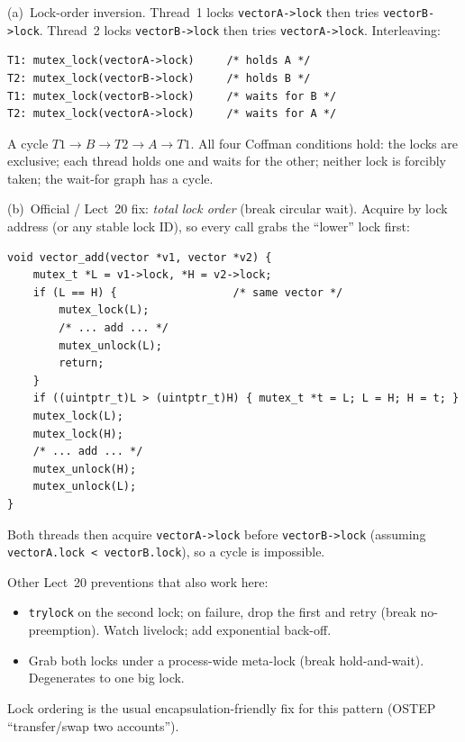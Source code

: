 \documentclass[11pt,a4paper]{article}
\newenvironment{Sol}{%
  \begin{tcolorbox}[sboxstyle, title={Solution}]%
}{%
  \end{tcolorbox}\vspace{0.35em}%
}
\begin{document}
\begin{Sol}
(a)~Lock-order inversion. Thread~1 locks \texttt{vectorA->lock} then tries
\texttt{vectorB->lock}. Thread~2 locks \texttt{vectorB->lock} then tries
\texttt{vectorA->lock}. Interleaving:
\begin{lstlisting}[numbers=none]
T1: mutex_lock(vectorA->lock)     /* holds A */
T2: mutex_lock(vectorB->lock)     /* holds B */
T1: mutex_lock(vectorB->lock)     /* waits for B */
T2: mutex_lock(vectorA->lock)     /* waits for A */
\end{lstlisting}
A cycle $T1 \to B \to T2 \to A \to T1$. All four Coffman conditions hold:
the locks are exclusive; each thread holds one and waits for the other;
neither lock is forcibly taken; the wait-for graph has a cycle.

(b)~Official / Lect~20 fix: \emph{total lock order} (break circular wait).
Acquire by lock address (or any stable lock ID), so every call grabs the
``lower'' lock first:
\begin{lstlisting}[numbers=none]
void vector_add(vector *v1, vector *v2) {
    mutex_t *L = v1->lock, *H = v2->lock;
    if (L == H) {                  /* same vector */
        mutex_lock(L);
        /* ... add ... */
        mutex_unlock(L);
        return;
    }
    if ((uintptr_t)L > (uintptr_t)H) { mutex_t *t = L; L = H; H = t; }
    mutex_lock(L);
    mutex_lock(H);
    /* ... add ... */
    mutex_unlock(H);
    mutex_unlock(L);
}
\end{lstlisting}
Both threads then acquire \texttt{vectorA->lock} before \texttt{vectorB->lock} (assuming
\texttt{vectorA.lock < vectorB.lock}), so a cycle is impossible.

Other Lect~20 preventions that also work here:
\begin{itemize}
  \item \texttt{trylock} on the second lock; on failure, drop the first and
        retry (break no-preemption). Watch livelock; add exponential
        back-off.
  \item Grab both locks under a process-wide meta-lock (break
        hold-and-wait). Degenerates to one big lock.
\end{itemize}
Lock ordering is the usual encapsulation-friendly fix for this pattern
(OSTEP ``transfer/swap two accounts'').
\end{Sol}
\end{document}
